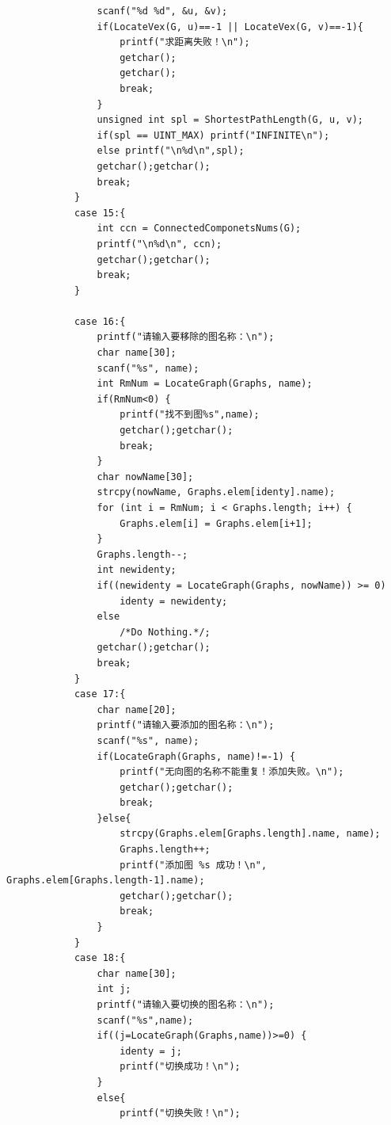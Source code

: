 \documentclass[supercite]{Experimental_Report}
\theoremstyle{definition}
\begin{document}
\begin{lstlisting}
                scanf("%d %d", &u, &v);
                if(LocateVex(G, u)==-1 || LocateVex(G, v)==-1){
                    printf("求距离失败！\n");
                    getchar();
                    getchar();
                    break;
                }
                unsigned int spl = ShortestPathLength(G, u, v);
                if(spl == UINT_MAX) printf("INFINITE\n");
                else printf("\n%d\n",spl);
                getchar();getchar();
                break;
            }
            case 15:{
                int ccn = ConnectedComponetsNums(G);
                printf("\n%d\n", ccn);
                getchar();getchar();
                break;
            }
        
            case 16:{
                printf("请输入要移除的图名称：\n");
                char name[30];
                scanf("%s", name);
                int RmNum = LocateGraph(Graphs, name);
                if(RmNum<0) {
                    printf("找不到图%s",name);
                    getchar();getchar();
                    break;
                }
                char nowName[30];
                strcpy(nowName, Graphs.elem[identy].name);
                for (int i = RmNum; i < Graphs.length; i++) {
                    Graphs.elem[i] = Graphs.elem[i+1];
                }
                Graphs.length--;
                int newidenty;
                if((newidenty = LocateGraph(Graphs, nowName)) >= 0)
                    identy = newidenty;
                else
                    /*Do Nothing.*/;
                getchar();getchar();
                break;
            }
            case 17:{
                char name[20];
                printf("请输入要添加的图名称：\n");
                scanf("%s", name);
                if(LocateGraph(Graphs, name)!=-1) {
                    printf("无向图的名称不能重复！添加失败。\n");
                    getchar();getchar();
                    break;
                }else{
                    strcpy(Graphs.elem[Graphs.length].name, name);
                    Graphs.length++;
                    printf("添加图 %s 成功！\n", Graphs.elem[Graphs.length-1].name);
                    getchar();getchar();
                    break;
                }
            }
            case 18:{
                char name[30];
                int j;
                printf("请输入要切换的图名称：\n");
                scanf("%s",name);
                if((j=LocateGraph(Graphs,name))>=0) {
                    identy = j;
                    printf("切换成功！\n");
                }
                else{
                    printf("切换失败！\n");

\end{lstlisting}
\end{document}
